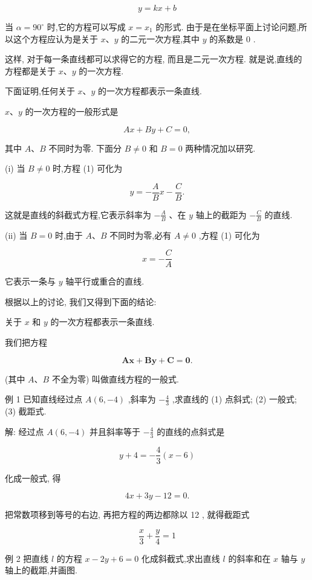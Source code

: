 \documentclass[lang=cn,newtx,10pt,scheme=chinese]{elegantbook}
\begin{document}
\[
  y = {kx} + b
\]

当 \(\alpha = {90}^{ \circ }\) 时,它的方程可以写成 \(x = {x}_{1}\) 的形式. 由于是在坐标平面上讨论问题,所以这个方程应认为是关于 \(x\text{、}y\) 的二元一次方程,其中 \(y\) 的系数是 0 .

这样, 对于每一条直线都可以求得它的方程, 而且是二元一次方程. 就是说,直线的方程都是关于 \(x\text{、}y\) 的一次方程.
\begin{corollary}[直线方程的一般形式]
下面证明,任何关于 \(x\text{、}y\) 的一次方程都表示一条直线.

\(x\text{、}y\) 的一次方程的一般形式是

\[
    {Ax} + {By} + C = 0, \tag{1}
\]
\end{corollary}
其中 \(A\text{、}B\) 不同时为零. 下面分 \(B \neq 0\) 和 \(B = 0\) 两种情况加以研究.

(i) 当 \(B \neq 0\) 时,方程 (1) 可化为

\[
  y = - \frac{A}{B}x - \frac{C}{B}.
\]

这就是直线的斜截式方程,它表示斜率为 \(- \frac{A}{B}\) 、在 \(y\) 轴上的截距为 \(- \frac{C}{B}\) 的直线.

(ii) 当 \(B = 0\) 时,由于 \(A\text{、}B\) 不同时为零,必有 \(A \neq 0\) ,方程 (1) 可化为

\[
  x = - \frac{C}{A}
\]

它表示一条与 \(y\) 轴平行或重合的直线.

根据以上的讨论, 我们又得到下面的结论:

关于 \(x\) 和 \(y\) 的一次方程都表示一条直线.

我们把方程

\[
  \mathbf{A}\mathbf{x} + \mathbf{B}\mathbf{y} + \mathbf{C} = \mathbf{0}. \tag{1}
\]

(其中 \(A\text{、}B\) 不全为零) 叫做直线方程的一般式.

例 1 已知直线经过点 \(A\left( {6, - 4}\right)\) ,斜率为 \(- \frac{4}{3}\) ,求直线的 (1) 点斜式; (2) 一般式; (3) 截距式.

解: 经过点 \(A\left( {6, - 4}\right)\) 并且斜率等于 \(- \frac{4}{3}\) 的直线的点斜式是

\[
  y + 4 = - \frac{4}{3}\left( {x - 6}\right)
\]

化成一般式, 得

\[
    {4x} + {3y} - {12} = 0.
\]

把常数项移到等号的右边, 再把方程的两边都除以 12 , 就得截距式

\[
  \frac{x}{3} + \frac{y}{4} = 1
\]

例 2 把直线 \(l\) 的方程 \(x - {2y} + 6 = 0\) 化成斜截式,求出直线 \(l\) 的斜率和在 \(x\) 轴与 \(y\) 轴上的截距,并画图.
\end{document}

